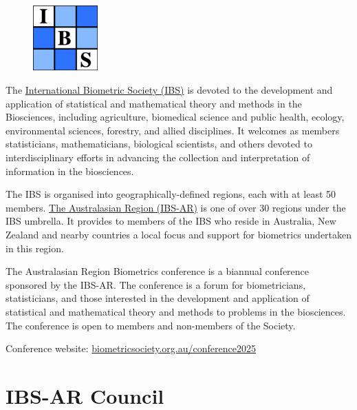 \documentclass[
]{scrreprt}
\begin{document}
\begin{figure}
\includegraphics[width=2.5cm]{assets/sponsors/logo.jpg}
\end{figure}

The \href{https://www.biometricsociety.org/}{International Biometric
Society (IBS)} is devoted to the development and application of
statistical and mathematical theory and methods in the Biosciences,
including agriculture, biomedical science and public health, ecology,
environmental sciences, forestry, and allied disciplines. It welcomes as
members statisticians, mathematicians, biological scientists, and others
devoted to interdisciplinary efforts in advancing the collection and
interpretation of information in the biosciences.

The IBS is organised into geographically-defined regions, each with at
least 50 members. \href{https://biometricsociety.org.au/}{The
Australasian Region (IBS-AR)} is one of over 30 regions under the IBS
umbrella. It provides to members of the IBS who reside in Australia, New
Zealand and nearby countries a local focus and support for biometrics
undertaken in this region.

The Australasian Region Biometrics conference is a biannual conference
sponsored by the IBS-AR. The conference is a forum for biometricians,
statisticians, and those interested in the development and application
of statistical and mathematical theory and methods to problems in the
biosciences. The conference is open to members and non-members of the
Society.

\Large Conference website:
\href{https://biometricsociety.org.au/conference2025}{biometricsociety.org.au/conference2025}

\normalsize

\section{IBS-AR Council}\label{ibs-ar-council}
\end{document}
